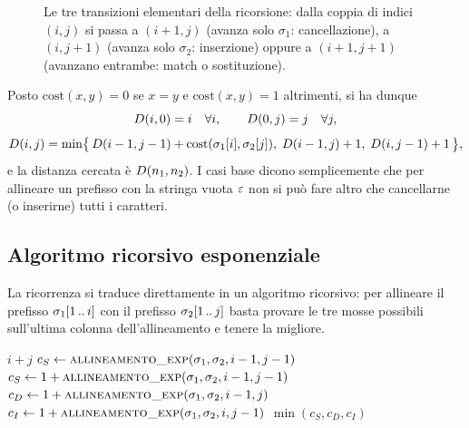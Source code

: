 \begin{figure}[H]
  \centering
  
  \caption{Le tre transizioni elementari della ricorsione: dalla coppia di
  indici $(i,j)$ si passa a $(i+1,j)$ (avanza solo $\sigma_1$: cancellazione), a
  $(i,j+1)$ (avanza solo $\sigma_2$: inserzione) oppure a $(i+1,j+1)$ (avanzano
  entrambe: match o sostituzione).}
  \label{fig:dp-stencil}
\end{figure}

Posto $\mathrm{cost}(x,y)=0$ se $x=y$ e $\mathrm{cost}(x,y)=1$ altrimenti, si
ha dunque
\[
  D(i,0)=i \quad \forall i, \qquad D(0,j)=j \quad \forall j,
\]
\[
  D(i,j)=\min\bigl\{\,D(i-1,j-1)+\mathrm{cost}(\sigma_1[i],\sigma_2[j]),\;
  D(i-1,j)+1,\; D(i,j-1)+1 \,\bigr\},
\]
e la distanza cercata è $D(n_1,n_2)$. I casi base dicono semplicemente che
per allineare un prefisso con la stringa vuota $\varepsilon$ non si può fare altro
che cancellarne (o inserirne) tutti i caratteri.

\subsection{Algoritmo ricorsivo esponenziale}

%
La ricorrenza si traduce direttamente in un algoritmo ricorsivo: per allineare
il prefisso $\sigma_1[1\,..\,i]$ con il prefisso $\sigma_2[1\,..\,j]$ basta
provare le tre mosse possibili sull'ultima colonna dell'allineamento e tenere
la migliore.

\begin{algorithm}[H]
\caption{\textsc{allineamento\_exp}: allineamento globale, versione ricorsiva}
\begin{algorithmic}[1]
    \State \Return $i+j$ 
  \EndIf
    \State $c_S \gets \Call{allineamento\_exp}{\sigma_1,\sigma_2,i-1,j-1}$
  \Else
    \State $c_S \gets 1+\Call{allineamento\_exp}{\sigma_1,\sigma_2,i-1,j-1}$
  \EndIf
  \State $c_D \gets 1+\Call{allineamento\_exp}{\sigma_1,\sigma_2,i-1,j}$
  \State $c_I \gets 1+\Call{allineamento\_exp}{\sigma_1,\sigma_2,i,j-1}$
  \State \Return $\min(c_S,c_D,c_I)$
\EndFunction
\end{algorithmic}
\end{algorithm}

